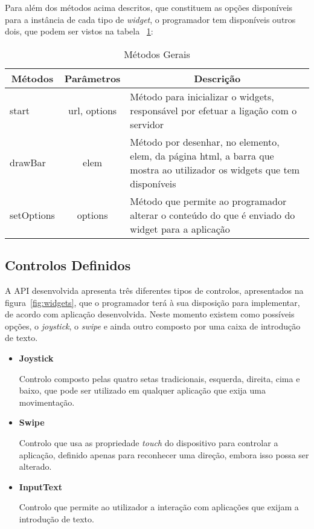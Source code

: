 Para além dos métodos acima descritos, que constituem as opções disponíveis para a instância de cada tipo de \textit{widget}, o programador tem disponíveis outros dois, que podem ser vistos na tabela ~\ref{table:metodos_g}:

\pagebreak

	\begin{table}[ht]
 	\renewcommand{\arraystretch}{1.5}
	\centering

	\begin{tabular}{ p{2cm} p{2cm} p{10cm}  }
	\multicolumn{1}{c}{\textbf{Métodos}} & \multicolumn{1}{c}{\textbf{Parâmetros}} & \multicolumn{1}{c}{\textbf{Descrição}} \\
	\hline
	start & \multicolumn{1}{c}{url, options} &Método para inicializar o widgets, responsável por efetuar a ligação com o servidor \\
	\hline
	drawBar & \multicolumn{1}{c}{elem} &Método por desenhar, no elemento, elem, da página html, a barra que mostra ao utilizador os widgets que tem disponíveis \\
	\hline
	setOptions & \multicolumn{1}{c}{options} &Método que permite ao programador alterar o conteúdo do que é enviado do widget para a aplicação  \\
	\hline
	\end{tabular}
	\caption{Métodos Gerais}
	\label{table:metodos_g}
	\end{table}

\subsection{Controlos Definidos}

	A API desenvolvida apresenta três diferentes tipos de controlos, apresentados na figura~\ref{fig:widgets}, que o programador terá à sua disposição para implementar, de acordo com aplicação desenvolvida. Neste momento existem como possíveis opções, o \textit{joystick}, o \textit{swipe} e ainda outro composto por uma caixa de introdução de texto.

	\begin{itemize}

	\item \textbf{Joystick}

		Controlo composto pelas quatro setas tradicionais, esquerda, direita, cima e baixo, que pode ser utilizado em qualquer aplicação que exija uma movimentação.

	\item \textbf{Swipe}

		Controlo que usa as propriedade \textit{touch} do dispositivo para controlar a aplicação, definido apenas para reconhecer uma direção, embora isso possa ser alterado.

	\item \textbf{InputText}

		Controlo que permite ao utilizador a interação com aplicações que exijam a introdução de texto.

	\end{itemize}

